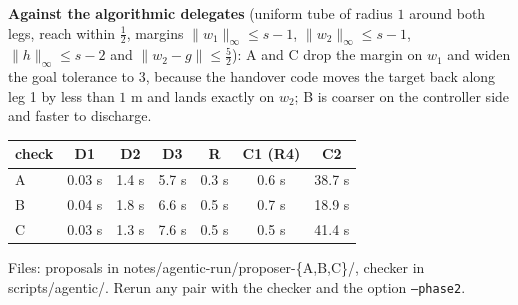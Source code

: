 \documentclass[10pt]{article}
\newcommand{\ninf}[1]{\lVert #1\rVert_\infty}
\begin{document}
\textbf{Against the algorithmic delegates} (uniform tube of radius $1$ around both legs, reach within $\tfrac12$, margins $\ninf{w_1}\le s-1$, $\ninf{w_2}\le s-1$, $\ninf{h}\le s-2$ and $\lVert w_2-g\rVert\le\tfrac52$): A and C drop the margin on $w_1$ and widen the goal tolerance to $3$, because the handover code moves the target back along leg 1 by less than $1$ m and lands exactly on $w_2$; B is coarser on the controller side and faster to discharge.

\begin{center}\small
\begin{tabular}{lcccccc}\toprule
check & D1 & D2 & D3 & R & C1 (R4) & C2 \\\midrule
A & 0.03 s & 1.4 s & 5.7 s & 0.3 s & 0.6 s & 38.7 s \\
B & 0.04 s & 1.8 s & 6.6 s & 0.5 s & 0.7 s & 18.9 s \\
C & 0.03 s & 1.3 s & 7.6 s & 0.5 s & 0.5 s & 41.4 s \\\bottomrule
\end{tabular}
\end{center}

Files: proposals in notes/agentic-run/proposer-\{A,B,C\}/, checker in scripts/agentic/. Rerun any pair with the checker and the option \texttt{--phase2}.
\end{document}
